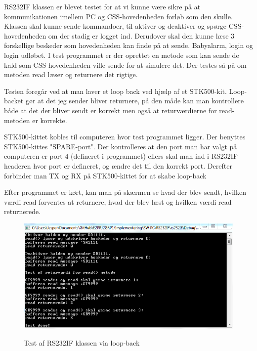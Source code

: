 
RS232IF klassen er blevet testet for at vi kunne være sikre på at kommunikationen imellem PC og CSS-hovedenheden forløb som den skulle. Klassen skal kunne sende kommandoer, til aktiver og deaktiver og spørge CSS-hovedenheden om der stadig er logget ind. Derudover skal den kunne læse 3 forskellige beskeder som hovedenheden kan finde på at sende. Babyalarm, login og login udløbet. I test programmet er der oprettet en metode som kan sende de kald som CSS-hovedenheden ville sende for at simulere det. Der testes så på om metoden read læser og returnere det rigtige. 

\medskip

Testen foregår ved at man laver et loop back ved hjælp af et STK500-kit. Loop-backet gør at det jeg sender bliver returnere, på den måde kan man kontrollere både at det der bliver sendt er korrekt men også at returværdierne for read-metoden er korrekte. 

\medskip

STK500-kittet kobles til computeren hvor test programmet ligger. Der benyttes STK500-kittes "SPARE-port". Der kontrolleres at den port man har valgt på computeren er port 4 (defineret i programmet) ellers skal man ind i RS232IF headeren hvor port er defineret, og ændre det til den korrekt port. Derefter forbinder man TX og RX på STK500-kittet for at skabe loop-back
 
 \medskip
Efter programmet er kørt, kan man på skærmen se hvad der blev sendt, hvilken værdi read forventes at returnere, hvad der blev læst og hvilken værdi read returnerede.

\begin{figure}[!htb]
     {\includegraphics[width=\textwidth]{billeder/SWTest/RS232IF_pc_test}}
     \caption{Test af RS232IF klassen via loop-back}
     \label{fig:RS232IF klasse test}
\end{figure}